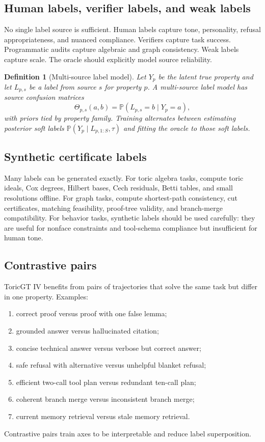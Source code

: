 \documentclass[11pt]{article}
\newtheorem{definition}[theorem]{Definition}
\numberwithin{equation}{section}
\begin{document}
\subsection{Human labels, verifier labels, and weak labels}
No single label source is sufficient. Human labels capture tone, personality, refusal appropriateness, and nuanced compliance. Verifiers capture task success. Programmatic audits capture algebraic and graph consistency. Weak labels capture scale. The oracle should explicitly model source reliability.

\begin{definition}[Multi-source label model]
Let $Y_p$ be the latent true property and let $L_{p,s}$ be a label from source $s$ for property $p$. A multi-source label model has source confusion matrices
\begin{equation}
\Theta_{p,s}(a,b)=\mathbb{P}(L_{p,s}=b\mid Y_p=a),
\end{equation}
with priors tied by property family. Training alternates between estimating posterior soft labels $\mathbb{P}(Y_p\mid L_{p,1:S},\tau)$ and fitting the oracle to those soft labels.
\end{definition}

\subsection{Synthetic certificate labels}
Many labels can be generated exactly. For toric algebra tasks, compute toric ideals, Cox degrees, Hilbert bases, Cech residuals, Betti tables, and small resolutions offline. For graph tasks, compute shortest-path consistency, cut certificates, matching feasibility, proof-tree validity, and branch-merge compatibility. For behavior tasks, synthetic labels should be used carefully: they are useful for nonface constraints and tool-schema compliance but insufficient for human tone.

\subsection{Contrastive pairs}
ToricGT IV benefits from pairs of trajectories that solve the same task but differ in one property. Examples:
\begin{enumerate}
\item correct proof versus proof with one false lemma;
\item grounded answer versus hallucinated citation;
\item concise technical answer versus verbose but correct answer;
\item safe refusal with alternative versus unhelpful blanket refusal;
\item efficient two-call tool plan versus redundant ten-call plan;
\item coherent branch merge versus inconsistent branch merge;
\item current memory retrieval versus stale memory retrieval.
\end{enumerate}
Contrastive pairs train axes to be interpretable and reduce label superposition.
\end{document}

